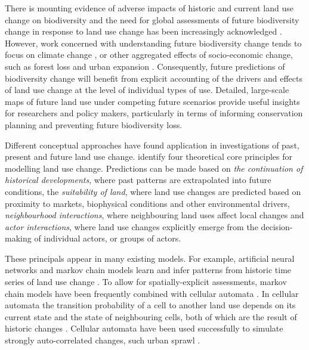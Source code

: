 \documentclass[titlesmallcaps,copyrightpage]{uomthesis}\usepackage[]{graphicx}\usepackage[]{color}
\begin{document}
There is mounting evidence of adverse impacts of historic and current
land use change on biodiversity and the need for global assessments of
future biodiversity change in response to land use change has been
increasingly acknowledged
\citep{urban_improving_2016, kim_protocol_2018, powers_global_2019}.
However, work concerned with understanding future biodiversity change
tends to focus on climate change
\citep{titeux_biodiversity_2016, struebig_anticipated_2015, urban_improving_2016},
or other aggregated effects of socio-economic change, such as forest
loss \citep{perez-vega_comparing_2012, margono_primary_2014} and urban
expansion \citep{seto_global_2012}. Consequently, future predictions of
biodiversity change will benefit from explicit accounting of the drivers
and effects of land use change at the level of individual types of use.
Detailed, large-scale maps of future land use under competing future
scenarios provide useful insights for researchers and policy makers,
particularly in terms of informing conservation planning and preventing
future biodiversity loss.

Different conceptual approaches have found application in investigations
of past, present and future land use change. \citet{koomen_core_2011}
identify four theoretical core principles for modelling land use change.
Predictions can be made based on \emph{the continuation of historical
developments}, where past patterns are extrapolated into future
conditions, the \emph{suitability of land}, where land use changes are
predicted based on proximity to markets, biophysical conditions and
other environmental drivers, \emph{neighbourhood interactions}, where
neighbouring land uses affect local changes and \emph{actor
interactions}, where land use changes explicitly emerge from the
decision-making of individual actors, or groups of actors.

These principals appear in many existing models. For example, artificial
neural networks and markov chain models learn and infer patterns from
historic time series of land use change
\citep{tayyebi_modeling_2014, pijanowski_using_2002}. To allow for
spatially-explicit assessments, markov chain models have been frequently
combined with cellular automata \citep[CA-Markov models,
see][]{hyandye_markovian_2017, aburas_improving_2017, koomen_core_2011}.
In cellular automata the transition probability of a cell to another
land use depends on its current state and the state of neighbouring
cells, both of which are the result of historic changes
\citep{koomen_core_2011}. Cellular automata have been used successfully
to simulate strongly auto-correlated changes, such urban sprawl
\citep{verburg_land_2004, fang_impact_2005, shafizadeh_moghadam_spatiotemporal_2013, sun_modeling_2007}.
\end{document}
